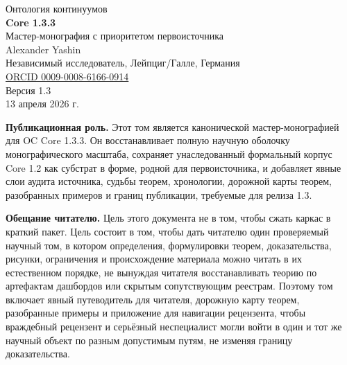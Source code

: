 \begin{titlepage}
\thispagestyle{empty}
\begin{center}
{\Large Онтология континуумов}\\[0.6cm]
{\huge \textbf{Core 1.3.3}}\\[0.3cm]
{\Large Мастер-монография с приоритетом первоисточника}\\[1.2cm]

{\Large Alexander Yashin}\\[0.2cm]
{\normalsize Независимый исследователь, Лейпциг/Галле, Германия}\\[0.2cm]
{\normalsize \href{https://orcid.org/0009-0008-6166-0914}{ORCID 0009-0008-6166-0914}}\\[1.0cm]

{\normalsize Версия 1.3}\\[0.2cm]
{\normalsize 13 апреля 2026 г.}\\[1.2cm]

\begin{minipage}{0.88\textwidth}
\small
\textbf{Публикационная роль.} Этот том является канонической мастер-монографией для OC Core 1.3.3.
Он восстанавливает полную научную оболочку монографического масштаба, сохраняет унаследованный формальный корпус
Core 1.2 как субстрат в форме, родной для первоисточника, и добавляет явные слои аудита источника, судьбы теорем,
хронологии, дорожной карты теорем, разобранных примеров и границ публикации, требуемые для релиза 1.3.

\medskip

\textbf{Обещание читателю.} Цель этого документа не в том, чтобы сжать каркас в
краткий пакет. Цель состоит в том, чтобы дать читателю один проверяемый научный том, в котором
определения, формулировки теорем, доказательства, рисунки, ограничения и происхождение материала можно читать в
их естественном порядке, не вынуждая читателя восстанавливать теорию по артефактам дашбордов
или скрытым сопутствующим реестрам. Поэтому том включает явный путеводитель для читателя,
дорожную карту теорем, разобранные примеры и приложение для навигации рецензента, чтобы
враждебный рецензент и серьёзный неспециалист могли войти в один и тот же научный объект по разным допустимым
путям, не изменяя границу доказательства.
\end{minipage}


\end{center}
\end{titlepage}
